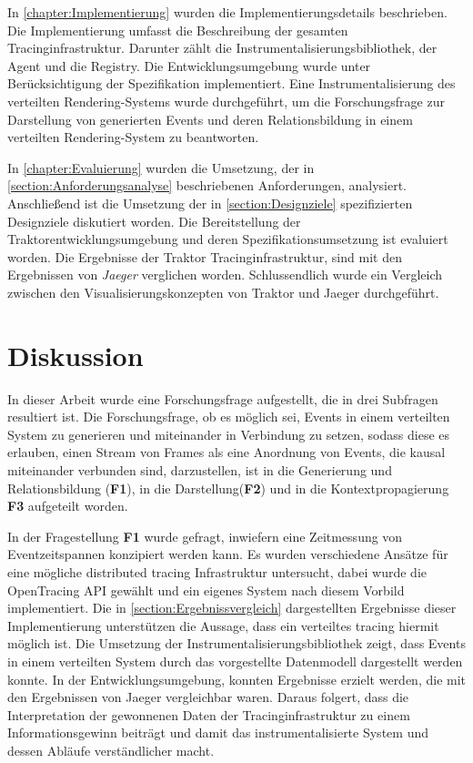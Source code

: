 In \cref{chapter:Implementierung} wurden die Implementierungsdetails beschrieben. Die Implementierung umfasst die Beschreibung der gesamten Tracinginfrastruktur. Darunter zählt die Instrumentalisierungsbibliothek, der Agent und die Registry. Die Entwicklungsumgebung wurde unter Berücksichtigung der Spezifikation implementiert. Eine Instrumentalisierung des verteilten Rendering-Systems wurde durchgeführt, um die Forschungsfrage zur Darstellung von generierten Events und deren Relationsbildung in einem verteilten Rendering-System zu beantworten.

In \cref{chapter:Evaluierung} wurden die Umsetzung, der in \cref{section:Anforderungsanalyse} beschriebenen Anforderungen, analysiert. Anschließend ist die Umsetzung der in \cref{section:Designziele} spezifizierten Designziele diskutiert worden. Die Bereitstellung der Traktorentwicklungsumgebung und deren Spezifikationsumsetzung ist evaluiert worden. Die Ergebnisse der Traktor Tracinginfrastruktur, sind mit den Ergebnissen von \emph{Jaeger} verglichen worden. Schlussendlich wurde ein Vergleich zwischen den Visualisierungskonzepten von Traktor und Jaeger durchgeführt.

\section{Diskussion}
\label{Diskussion}

In dieser Arbeit wurde eine Forschungsfrage aufgestellt, die in drei Subfragen resultiert ist. Die Forschungsfrage, ob es möglich sei, Events in einem verteilten System zu generieren und miteinander in Verbindung zu setzen, sodass diese es erlauben, einen Stream von Frames als eine Anordnung von Events, die kausal miteinander verbunden sind, darzustellen, ist in die Generierung und Relationsbildung (\textbf{F1}), in die Darstellung(\textbf{F2}) und in die Kontextpropagierung \textbf{F3} aufgeteilt worden.


In der Fragestellung \textbf{F1} wurde gefragt, inwiefern eine Zeitmessung von Eventzeitspannen konzipiert werden kann. Es wurden verschiedene Ansätze für eine mögliche distributed tracing Infrastruktur untersucht, dabei wurde die OpenTracing API gewählt und ein eigenes System nach diesem Vorbild implementiert. Die in \cref{section:Ergebnissvergleich} dargestellten Ergebnisse dieser Implementierung unterstützen die Aussage, dass ein verteiltes tracing hiermit möglich ist. Die Umsetzung der Instrumentalisierungsbibliothek zeigt, dass Events in einem verteilten System durch das vorgestellte Datenmodell dargestellt werden konnte. In der Entwicklungsumgebung, konnten Ergebnisse erzielt werden, die mit den Ergebnissen von Jaeger vergleichbar waren. Daraus folgert, dass die Interpretation der gewonnenen Daten der Tracinginfrastruktur zu einem Informationsgewinn beiträgt und damit das instrumentalisierte System und dessen Abläufe verständlicher macht.

